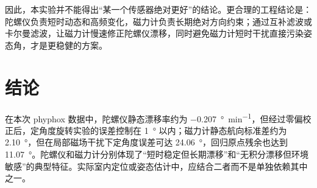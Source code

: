 \documentclass[UTF8,a4paper,12pt]{ctexart}
\begin{document}
因此，本实验并不能得出“某一个传感器绝对更好”的结论。更合理的工程结论是：陀螺仪负责短时动态和高频变化，磁力计负责长期绝对方向约束；通过互补滤波或卡尔曼滤波，让磁力计慢速修正陀螺仪漂移，同时避免磁力计短时干扰直接污染姿态角，才是更稳健的方案。

\section{结论}

在本次 phyphox 数据中，陀螺仪静态漂移率约为 \SI{-0.207}{\degree\per\minute}，但经过零偏校正后，定角度旋转实验的误差控制在 \SI{1}{\degree} 以内；磁力计静态航向标准差约为 \SI{2.10}{\degree}，但在局部磁场干扰下定角度误差可达 \SI{24.06}{\degree}，回归原点残余也达到 \SI{11.07}{\degree}。陀螺仪和磁力计分别体现了“短时稳定但长期漂移”和“无积分漂移但环境敏感”的典型特征。实际室内定位或姿态估计中，应结合二者而不是单独依赖其中之一。
\end{document}
